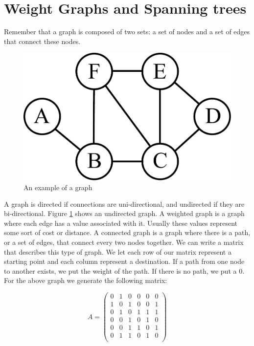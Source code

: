 \label{Ch:Kruskal}


\section*{Weight Graphs and Spanning trees}

Remember that a graph is composed of two sets: a set of nodes and a set of edges that connect these nodes. 

\begin{figure}[H]
\includegraphics[width = .4\textwidth]{graph1.pdf}
\caption{An example of a graph}
\label{mst:graph1}
\end{figure}

A graph is directed if connections are uni-directional, and undirected if they are bi-directional.
Figure \ref{mst:graph1} shows an undirected graph.
A weighted graph is a graph where each edge has a value associated with it.
Usually these values represent some sort of cost or distance.
A connected graph is a graph where there is a path, or a set of edges, that connect every two nodes together.
We can write a matrix that describes this type of graph.
We let each row of our matrix represent a starting point and each column represent a destination.
If a path from one node to another exists, we put the weight of the path.
If there is no path, we put a 0.
For the above graph we generate the following matrix:

\[
A = \begin{pmatrix}
0 & 1 & 0 & 0 & 0 & 0\\
1 & 0 & 1 & 0 & 0 & 1\\
0 & 1 & 0 & 1 & 1 & 1\\
0 & 0 & 1 & 0 & 1 & 0\\
0 & 0 & 1 & 1 & 0 & 1\\
0 & 1 & 1 & 0 & 1 & 0\\
\end{pmatrix}
\]

